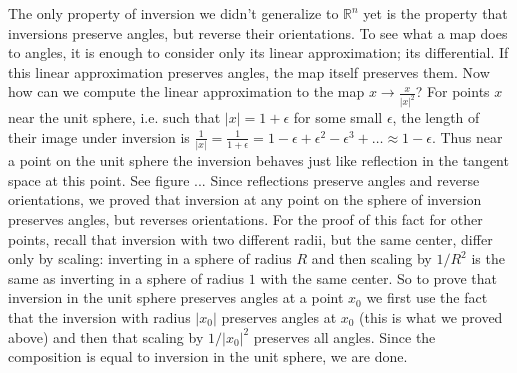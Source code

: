 The only property of inversion we didn't generalize to $\mathbb{R}^n$ yet is the property that inversions preserve angles, but reverse their orientations. To see what a map does to angles, it is enough to consider only its linear approximation; its differential. If this linear approximation preserves angles, the map itself preserves them.
Now how can we compute the linear approximation to the map $x\rightarrow\frac{x}{|x|^2}$? For points $x$ near the unit sphere, i.e. such that $|x|=1+\epsilon$ for some small $\epsilon$, the length of their image under inversion is $\frac{1}{|x|}=\frac{1}{1+\epsilon}=1-\epsilon+\epsilon^2-\epsilon^3+\ldots\approx 1-\epsilon$. Thus near a point on the unit sphere the inversion behaves just like reflection in the tangent space at this point.
See figure ...
Since reflections preserve angles and reverse orientations, we proved that inversion at any point on the sphere of inversion preserves angles, but reverses orientations. For the proof of this fact for other points, recall that inversion with two different radii, but the same center, differ only by scaling: inverting in a sphere of radius $R$ and then scaling by $1/R^2$ is the same as inverting in a sphere of radius $1$ with the same center. So to prove that inversion in the unit sphere preserves angles at a point $x_0$ we first use the fact that the inversion with radius $|x_0|$ preserves angles at $x_0$ (this is what we proved above) and then that scaling by $1/|x_0|^2$ preserves all angles. Since the composition is equal to inversion in the unit sphere, we are done.
